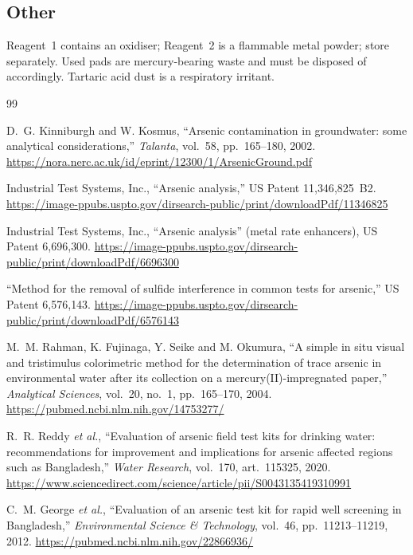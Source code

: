 \documentclass[11pt,a4paper]{article}
\begin{document}
\subsection{Other}

Reagent~1 contains an oxidiser; Reagent~2 is a flammable metal powder;
store separately. Used pads are mercury-bearing waste and must be disposed
of accordingly. Tartaric acid dust is a respiratory irritant.

\begin{thebibliography}{99}

D.~G. Kinniburgh and W. Kosmus,
``Arsenic contamination in groundwater: some analytical considerations,''
\emph{Talanta}, vol.~58, pp.~165--180, 2002.
\url{https://nora.nerc.ac.uk/id/eprint/12300/1/ArsenicGround.pdf}

Industrial Test Systems, Inc.,
``Arsenic analysis,'' US Patent 11{,}346{,}825~B2.
\url{https://image-ppubs.uspto.gov/dirsearch-public/print/downloadPdf/11346825}

Industrial Test Systems, Inc.,
``Arsenic analysis'' (metal rate enhancers), US Patent 6{,}696{,}300.
\url{https://image-ppubs.uspto.gov/dirsearch-public/print/downloadPdf/6696300}

``Method for the removal of sulfide interference in common tests for
arsenic,'' US Patent 6{,}576{,}143.
\url{https://image-ppubs.uspto.gov/dirsearch-public/print/downloadPdf/6576143}

M.~M. Rahman, K. Fujinaga, Y. Seike and M. Okumura,
``A simple in situ visual and tristimulus colorimetric method for the
determination of trace arsenic in environmental water after its collection
on a mercury(II)-impregnated paper,''
\emph{Analytical Sciences}, vol.~20, no.~1, pp.~165--170, 2004.
\url{https://pubmed.ncbi.nlm.nih.gov/14753277/}

R.~R. Reddy \emph{et al.},
``Evaluation of arsenic field test kits for drinking water: recommendations
for improvement and implications for arsenic affected regions such as
Bangladesh,''
\emph{Water Research}, vol.~170, art.~115325, 2020.
\url{https://www.sciencedirect.com/science/article/pii/S0043135419310991}

C.~M. George \emph{et al.},
``Evaluation of an arsenic test kit for rapid well screening in
Bangladesh,''
\emph{Environmental Science \& Technology}, vol.~46, pp.~11213--11219, 2012.
\url{https://pubmed.ncbi.nlm.nih.gov/22866936/}


\end{thebibliography}
\end{document}
